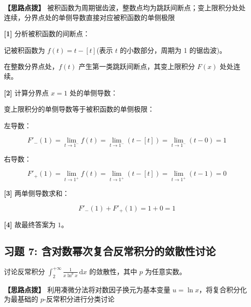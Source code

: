 \documentclass[11pt,a4paper,UTF8]{ctexart}
\begin{document}
\textbf{\color{DeepPurple}【思路点拨】} 被积函数为周期锯齿波，整数点均为跳跃间断点；变上限积分处处连续，分界点处的单侧导数直接对应被积函数的单侧极限


\begin{solbox}[分步推导与答题规范]
\textbf{[1]} 分析被积函数的间断点：

记被积函数为 $f(t) = t - [t]$(表示 $t$ 的小数部分，周期为 1 的锯齿波)。

在整数分界点处，$f(t)$ 产生第一类跳跃间断点，其变上限积分 $F(x)$ 处处连续。

\textbf{[2]} 计算分界点 $x = 1$ 处的单侧导数：

变上限积分的单侧导数等于被积函数的单侧极限：

左导数：


\begin{equation*}
F'_-(1) = \lim_{t \to 1^-} f(t) = \lim_{t \to 1^-} (t - [t]) = \lim_{t \to 1^-} (t - 0) = 1
\end{equation*}


右导数：


\begin{equation*}
F'_+(1) = \lim_{t \to 1^+} f(t) = \lim_{t \to 1^+} (t - [t]) = \lim_{t \to 1^+} (t - 1) = 0
\end{equation*}


\textbf{[3]} 两单侧导数求和：


\begin{equation*}
F'_-(1) + F'_+(1) = 1 + 0 = 1
\end{equation*}


\textbf{[4]} 故最终答案为 $1$。
\end{solbox}


\subsection{习题 7: 含对数幂次复合反常积分的敛散性讨论}

讨论反常积分 $\int_2^{+\infty} \frac{1}{x \ln^p x}\,\mathrm{d}x$ 的敛散性，其中 $p$ 为任意实数。

\textbf{\color{DeepPurple}【思路点拨】} 利用凑微分法将对数因子换元为基本变量 $u = \ln x$，将复合积分化为最基础的 $p$-反常积分进行分类讨论
\end{document}
